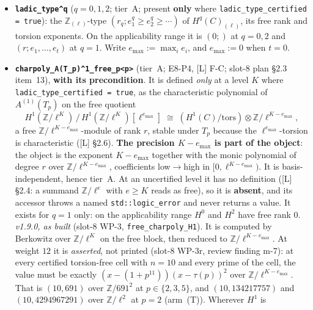 \documentclass[11pt]{article}
\theoremstyle{remark}
\newcommand{\Z}{\mathbb{Z}}
\begin{document}
\begin{itemize}
  against \texttt{invariant\_factors\_H\textasciicircum q} by universal coefficients; the cells
  whose torsion exponents are all $<2$ certify at $K=2$; and the two controls are uncertified at $K=2$, each with a
  deficit of exactly one, and certified at $K=3$. The deficit at $K=2$ is $r_2(d^0)=\dim
  C^0_{\mathrm{eq}}-1$, with $r_2(d^1)=\dim C^2_{\mathrm{eq}}$.
\item \textbf{\texttt{ladic\_type\textasciicircum q}} ($q=0,1,2$; tier~A; present \textbf{only}
  where \texttt{ladic\_type\_certified = true}): the $\Z_{(\ell)}$-type
  $(r_q;e^q_1\ge e^q_2\ge\cdots)$ of $H^q(C)_{(\ell)}$, its free rank and torsion exponents. On the
  applicability range it is $(0;)$ at $q=0,2$ and $(r;e_1,\dots,e_t)$ at $q=1$. Write
  $e_{\max}:=\max_ie_i$, and $e_{\max}:=0$ when $t=0$.
\item \textbf{\texttt{charpoly\_A(T\_p)\textasciicircum1\_free\_p<p>}} (tier~A; E8-P4, [L] F-C;
  slot-8 plan \S2.3 item~13), \textbf{with its precondition}. It is defined \emph{only} at a level
  $K$ where \texttt{ladic\_type\_certified = true}, as the characteristic polynomial of
  $A^{(1)}(T_p)$ on the free quotient
  \[
    H^1(\Z/\ell^K)\,/\,H^1(\Z/\ell^K)[\ell^{e_{\max}}]\;\cong\;(H^1(C)/\mathrm{tors})\otimes\Z/\ell^{K-e_{\max}},
  \]
  a free $\Z/\ell^{K-e_{\max}}$-module of rank $r$, stable under $T_p$ because the
  $\ell^{e_{\max}}$-torsion is characteristic ([L] \S2.6). \textbf{The precision $K-e_{\max}$ is
  part of the object}: the object is the exponent $K-e_{\max}$ together with the monic polynomial
  of degree $r$ over $\Z/\ell^{K-e_{\max}}$, coefficients low$\to$high in $[0,\ell^{K-e_{\max}})$.
  It is basis-independent, hence tier~A. At an uncertified level it has no definition ([L] \S2.4:
  a summand $\Z/\ell^e$ with $e\ge K$ reads as free), so it is \textbf{absent}, and its accessor
  throws a named \texttt{std::logic\_error} and never returns a value. It exists for $q=1$ only: on
  the applicability range $H^0$ and $H^2$ have free rank $0$. \emph{v1.9.0, as built} (slot-8
  WP-3, \texttt{free\_charpoly\_H1}). It is computed by Berkowitz over $\Z/\ell^K$ on the free
  block, then reduced to $\Z/\ell^{K-e_{\max}}$. At weight $12$ it is \emph{asserted}, not
  printed (slot-8 WP-3r, review finding m-7): at every certified torsion-free cell with $n=10$ and
  every prime of the cell, the value must be exactly $(x-(1+p^{11}))(x-\tau(p))^2$ over
  $\Z/\ell^{K-e_{\max}}$. That is $(10,691)$ over $\Z/691^2$ at $p\in\{2,3,5\}$, and
  $(10,134217757)$ and $(10,4294967291)$ over $\Z/\ell^2$ at $p=2$ (arm~(T)). Wherever $H^1$ is

\end{itemize}
\end{document}
